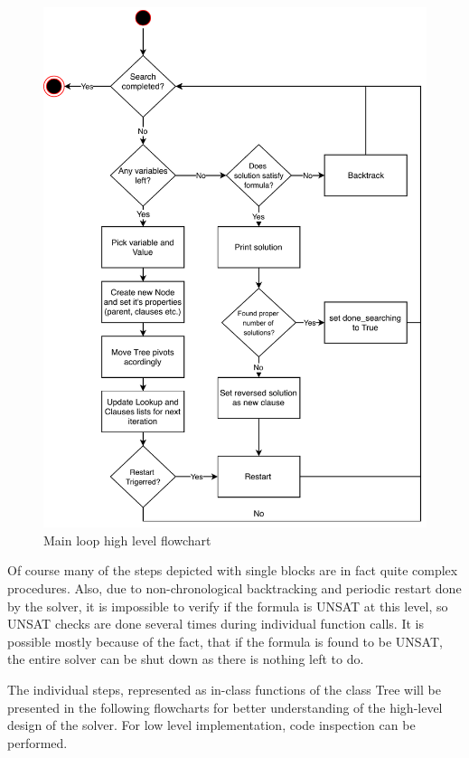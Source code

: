 \documentclass[12pt,english,pdflatex]{aghdpl}
\begin{document}
\begin{figure}[H]
\begin{centering}
\includegraphics[scale=0.9]{img/main_loop}
\par\end{centering}
\caption{Main loop high level flowchart}
\end{figure}

Of course many of the steps depicted with single blocks  are in fact quite complex procedures. Also,
due to non-chronological backtracking and periodic restart done by
the solver, it is impossible to verify if the formula is UNSAT at this level,
so UNSAT checks are done several times during individual function
calls. It is possible mostly because of the fact, that if the  formula is found to be UNSAT,
the entire solver can be shut down as there is nothing left to do.

The individual steps, represented as in-class functions of the class Tree
will be presented in the following flowcharts for better understanding
of the high-level design of the solver. For low level implementation, code inspection
can be performed.
\end{document}
